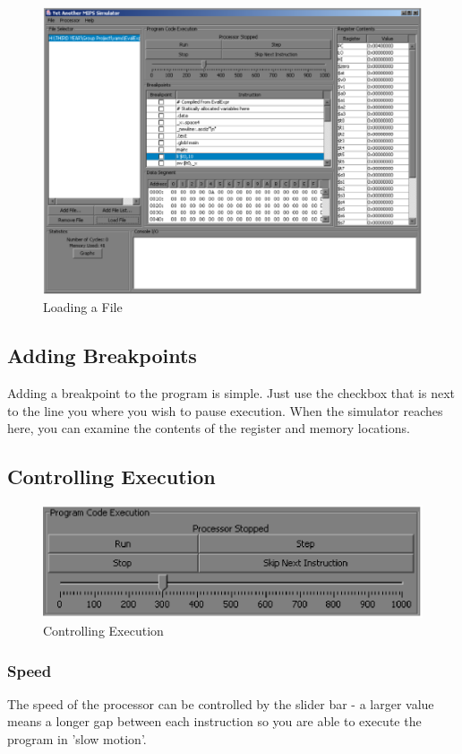 \begin{figure}[h]
\centering
\includegraphics[scale=0.5]{Ch4-Fig4.eps}
\caption{Loading a File}
\label{figure.Loading a File}
\end{figure}


\subsection{Adding Breakpoints}
Adding a breakpoint to the program is simple.  Just use the checkbox that is next to the line you where you wish to pause execution.  When the simulator reaches here, you can examine  the contents of the register and memory locations.

\subsection{Controlling Execution}

\begin{figure}[h]
\centering
\includegraphics[scale=0.5]{Ch4-Fig5.eps}
\caption{Controlling Execution}
\label{figure.Controlling Execution}
\end{figure}

\subsubsection{Speed}
The speed of the processor can be controlled by the slider bar - a larger value means a longer gap between each instruction so you are able to execute the program in 'slow motion'.  

